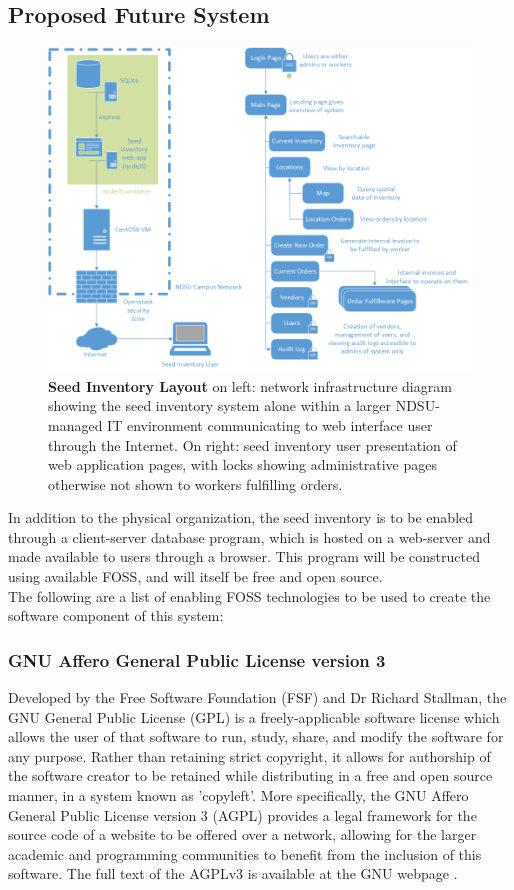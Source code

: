 \documentclass[12pt, letterpaper,oneocolumn]{article}
\begin{document}
	\subsection{Proposed Future System}
	\begin{center}
	\begin{figure}[H]
	\includegraphics[width=\linewidth]{SeedInventoryManagementSystem.png}
	\caption{\textbf{Seed Inventory Layout} on left: network infrastructure diagram showing the seed inventory system alone within a larger NDSU-managed IT environment communicating to web interface user through the Internet. On right: seed inventory user presentation of web application pages, with locks showing administrative pages otherwise not shown to workers fulfilling orders.}
		\end{figure}
\end{center}


In addition to the physical organization, the seed inventory is to be enabled through a client-server database program, which is hosted on a web-server and made available to users through a browser. This program will be constructed using available FOSS, and will itself be free and open source. \\
The following are a list of enabling FOSS technologies to be used to create the software component of this system:
		\subsubsection{GNU Affero General Public License version 3}
		Developed by the Free Software Foundation (FSF) and Dr Richard Stallman, the GNU General Public License (GPL) is a freely-applicable software license which allows the user of that software to run, study, share, and modify the software for any purpose. Rather than retaining strict copyright, it allows for authorship of the software creator to be retained while distributing in a free and open source manner, in a system known as 'copyleft'. More specifically, the GNU Affero General Public License version 3 (AGPL) provides a legal framework for the source code of a website to be offered over a network, allowing for the larger academic and programming communities to benefit from the inclusion of this software. The full text of the AGPLv3 is available at the GNU webpage \cite{GPLAffero}.
\end{document}
